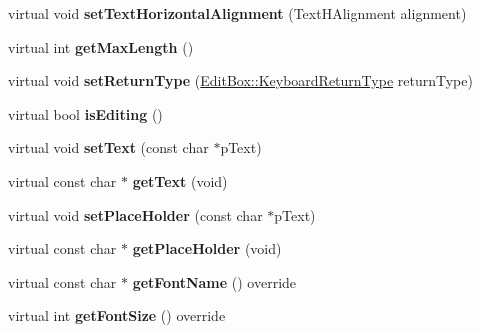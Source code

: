 \begin{DoxyCompactItemize}
virtual void {\bfseries set\+Text\+Horizontal\+Alignment} (Text\+H\+Alignment alignment)
\item 
\mbox{\label{classui_1_1EditBoxImplTizen_a05d5727bb24586592b7b1a4eeb1061ea}} 
virtual int {\bfseries get\+Max\+Length} ()
\item 
\mbox{\label{classui_1_1EditBoxImplTizen_a920b88ef47a7d0eec3093c509b6f8067}} 
virtual void {\bfseries set\+Return\+Type} (\hyperlink{classui_1_1EditBox_a1e1285b6f742975b26bdeb8108ca6e51}{Edit\+Box\+::\+Keyboard\+Return\+Type} return\+Type)
\item 
\mbox{\label{classui_1_1EditBoxImplTizen_a3957536235a36aca027687200d78f8ad}} 
virtual bool {\bfseries is\+Editing} ()
\item 
\mbox{\label{classui_1_1EditBoxImplTizen_a1806fba28b8cb7a97de86b77a3b54e70}} 
virtual void {\bfseries set\+Text} (const char $\ast$p\+Text)
\item 
\mbox{\label{classui_1_1EditBoxImplTizen_a15fe1b4f000930fb8b208aea20a15cc8}} 
virtual const char $\ast$ {\bfseries get\+Text} (void)
\item 
\mbox{\label{classui_1_1EditBoxImplTizen_aa70466a9f7fb9e8004c51e2f88f534f7}} 
virtual void {\bfseries set\+Place\+Holder} (const char $\ast$p\+Text)
\item 
\mbox{\label{classui_1_1EditBoxImplTizen_a313d8bb3e62a0936fe20a9c5a640676b}} 
virtual const char $\ast$ {\bfseries get\+Place\+Holder} (void)
\item 
\mbox{\label{classui_1_1EditBoxImplTizen_a5515307f188972d08d12e8e3c97ad760}} 
virtual const char $\ast$ {\bfseries get\+Font\+Name} () override
\item 
\mbox{\label{classui_1_1EditBoxImplTizen_a1cfb370dfd6fcd899000e3dd13fccb52}} 
virtual int {\bfseries get\+Font\+Size} () override
\item 
\mbox{\label{classui_1_1EditBoxImplTizen_a5ea35fea5f3045f8c130e5e0acd1e122}} 

\end{DoxyCompactItemize}
